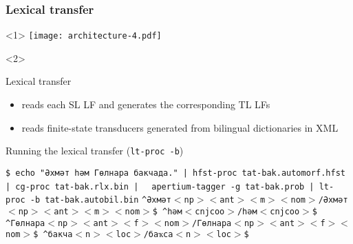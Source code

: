 \documentclass[10pt,xetex]{beamer} %
\begin{document}
\begin{frame}
  \frametitle{Lexical transfer} %

\begin{onlyenv}<1>
\texttt{[image: architecture-4.pdf]}
\end{onlyenv}
\begin{onlyenv}<2>

 \begin{block}{Lexical transfer} %
  \begin{itemize}
 \item reads each SL LF and generates the corresponding TL LFs
 \item reads finite-state transducers generated from bilingual dictionaries in XML
  \end{itemize}
  \end{block}
  \begin{block}{Running the lexical transfer ({\tt lt-proc -b})} %
  \begin{small}
     \texttt{\$ echo "Әхмәт һәм Гөлнара бакчада." | hfst-proc tat-bak.automorf.hfst | cg-proc tat-bak.rlx.bin | }
     \texttt{  apertium-tagger -g tat-bak.prob | lt-proc -b tat-bak.autobil.bin}
     \texttt{\^{}Әхмәт$<$np$><$ant$><$m$><$nom$>$/Әхмәт$<$np$><$ant$><$m$><$nom$>$\$ \^{}һәм$<$cnjcoo$>$/һәм$<$cnjcoo$>$\$ \^{}Гөлнара$<$np$><$ant$><$f$><$nom$>$/Гөлнара$<$np$><$ant$><$f$><$nom$>$\$ \^{}бакча$<$n$><$loc$>$/баҡса$<$n$><$loc$>$\$ }
  \end{small}
  \end{block}
\end{onlyenv}
\end{frame}
\end{document}
